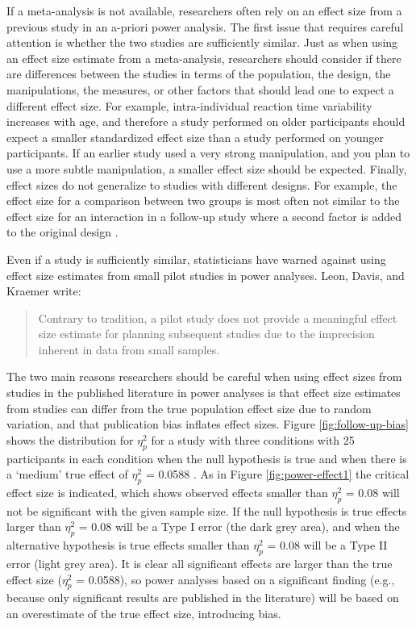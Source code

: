 \documentclass[
]{krantz}
\begin{document}
If a meta-analysis is not available, researchers often rely on an effect size from a previous study in an a-priori power analysis. The first issue that requires careful attention is whether the two studies are sufficiently similar. Just as when using an effect size estimate from a meta-analysis, researchers should consider if there are differences between the studies in terms of the population, the design, the manipulations, the measures, or other factors that should lead one to expect a different effect size. For example, intra-individual reaction time variability increases with age, and therefore a study performed on older participants should expect a smaller standardized effect size than a study performed on younger participants. If an earlier study used a very strong manipulation, and you plan to use a more subtle manipulation, a smaller effect size should be expected. Finally, effect sizes do not generalize to studies with different designs. For example, the effect size for a comparison between two groups is most often not similar to the effect size for an interaction in a follow-up study where a second factor is added to the original design \citep{lakens_simulation-based_2021}.

Even if a study is sufficiently similar, statisticians have warned against using effect size estimates from small pilot studies in power analyses. Leon, Davis, and Kraemer \citeyearpar{leon_role_2011} write:

\begin{quote}
Contrary to tradition, a pilot study does not provide a meaningful effect size estimate for planning subsequent studies due to the imprecision inherent in data from small samples.
\end{quote}

The two main reasons researchers should be careful when using effect sizes from studies in the published literature in power analyses is that effect size estimates from studies can differ from the true population effect size due to random variation, and that publication bias inflates effect sizes. Figure \ref{fig:follow-up-bias} shows the distribution for \(\eta_p^2\) for a study with three conditions with 25 participants in each condition when the null hypothesis is true and when there is a `medium' true effect of \(\eta_p^2\) = 0.0588 \citep{richardson_eta_2011}. As in Figure \ref{fig:power-effect1} the critical effect size is indicated, which shows observed effects smaller than \(\eta_p^2\) = 0.08 will not be significant with the given sample size. If the null hypothesis is true effects larger than \(\eta_p^2\) = 0.08 will be a Type I error (the dark grey area), and when the alternative hypothesis is true effects smaller than \(\eta_p^2\) = 0.08 will be a Type II error (light grey area). It is clear all significant effects are larger than the true effect size (\(\eta_p^2\) = 0.0588), so power analyses based on a significant finding (e.g., because only significant results are published in the literature) will be based on an overestimate of the true effect size, introducing bias.
\end{document}
